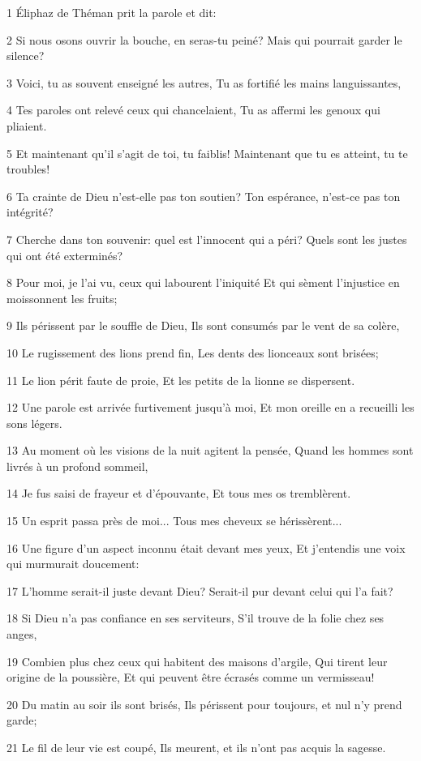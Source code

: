\par 1 Éliphaz de Théman prit la parole et dit:
\par 2 Si nous osons ouvrir la bouche, en seras-tu peiné? Mais qui pourrait garder le silence?
\par 3 Voici, tu as souvent enseigné les autres, Tu as fortifié les mains languissantes,
\par 4 Tes paroles ont relevé ceux qui chancelaient, Tu as affermi les genoux qui pliaient.
\par 5 Et maintenant qu'il s'agit de toi, tu faiblis! Maintenant que tu es atteint, tu te troubles!
\par 6 Ta crainte de Dieu n'est-elle pas ton soutien? Ton espérance, n'est-ce pas ton intégrité?
\par 7 Cherche dans ton souvenir: quel est l'innocent qui a péri? Quels sont les justes qui ont été exterminés?
\par 8 Pour moi, je l'ai vu, ceux qui labourent l'iniquité Et qui sèment l'injustice en moissonnent les fruits;
\par 9 Ils périssent par le souffle de Dieu, Ils sont consumés par le vent de sa colère,
\par 10 Le rugissement des lions prend fin, Les dents des lionceaux sont brisées;
\par 11 Le lion périt faute de proie, Et les petits de la lionne se dispersent.
\par 12 Une parole est arrivée furtivement jusqu'à moi, Et mon oreille en a recueilli les sons légers.
\par 13 Au moment où les visions de la nuit agitent la pensée, Quand les hommes sont livrés à un profond sommeil,
\par 14 Je fus saisi de frayeur et d'épouvante, Et tous mes os tremblèrent.
\par 15 Un esprit passa près de moi... Tous mes cheveux se hérissèrent...
\par 16 Une figure d'un aspect inconnu était devant mes yeux, Et j'entendis une voix qui murmurait doucement:
\par 17 L'homme serait-il juste devant Dieu? Serait-il pur devant celui qui l'a fait?
\par 18 Si Dieu n'a pas confiance en ses serviteurs, S'il trouve de la folie chez ses anges,
\par 19 Combien plus chez ceux qui habitent des maisons d'argile, Qui tirent leur origine de la poussière, Et qui peuvent être écrasés comme un vermisseau!
\par 20 Du matin au soir ils sont brisés, Ils périssent pour toujours, et nul n'y prend garde;
\par 21 Le fil de leur vie est coupé, Ils meurent, et ils n'ont pas acquis la sagesse.

